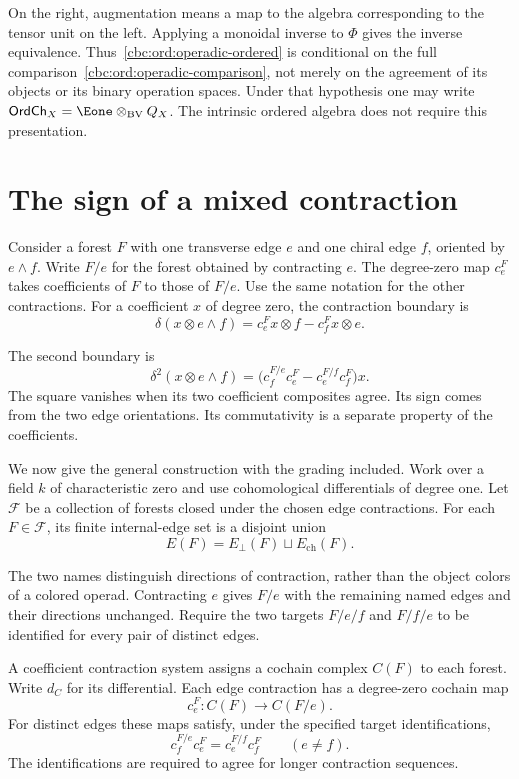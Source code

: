 On the right, augmentation means a map to the algebra corresponding to the tensor unit on the left. Applying a monoidal inverse to $\Phi$ gives the inverse equivalence. Thus~\eqref{cbc:ord:operadic-ordered} is conditional on the full comparison~\eqref{cbc:ord:operadic-comparison}, not merely on the agreement of its objects or its binary operation spaces. Under that hypothesis one may write $\mathsf{OrdCh}_X=\Eone\otimes_{\mathrm{BV}}Q_X$. The intrinsic ordered algebra does not require this presentation.

\section{The sign of a mixed contraction}
Consider a forest $F$ with one transverse edge $e$ and one chiral edge $f$, oriented by $e\wedge f$. Write $F/e$ for the forest obtained by contracting $e$. The degree-zero map $c_e^F$ takes coefficients of $F$ to those of $F/e$. Use the same notation for the other contractions. For a coefficient $x$ of degree zero, the contraction boundary is
\[
 \delta(x\otimes e\wedge f)
 =c_e^Fx\otimes f-c_f^Fx\otimes e.
\]

The second boundary is
\begin{equation}\label{cbc:ord:two-edge}
 \delta^2(x\otimes e\wedge f)
 =\bigl(c_f^{F/e}c_e^F-c_e^{F/f}c_f^F\bigr)x.
\end{equation}
The square vanishes when its two coefficient composites agree. Its sign comes from the two edge orientations. Its commutativity is a separate property of the coefficients.

We now give the general construction with the grading included. Work over a field $k$ of characteristic zero and use cohomological differentials of degree one. Let $\mathcal F$ be a collection of forests closed under the chosen edge contractions. For each $F\in\mathcal F$, its finite internal-edge set is a disjoint union
\[
 E(F)=E_\perp(F)\sqcup E_{\mathrm{ch}}(F).
\]

The two names distinguish directions of contraction, rather than the object colors of a colored operad. Contracting $e$ gives $F/e$ with the remaining named edges and their directions unchanged. Require the two targets $F/e/f$ and $F/f/e$ to be identified for every pair of distinct edges.

\begin{definition}\label{cbc:ord:contraction-system}
A coefficient contraction system assigns a cochain complex $C(F)$ to each forest. Write $d_C$ for its differential. Each edge contraction has a degree-zero cochain map
\[
 c_e^F:C(F)\longrightarrow C(F/e).
\]
For distinct edges these maps satisfy, under the specified target identifications,
\begin{equation}\label{cbc:ord:contraction-square}
 c_f^{F/e}c_e^F=c_e^{F/f}c_f^F
 \qquad(e\ne f).
\end{equation}
The identifications are required to agree for longer contraction sequences.
\end{definition}

